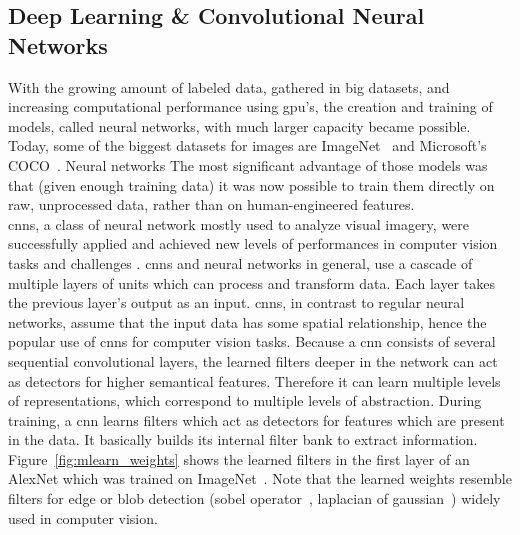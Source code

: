 \subsection{Deep Learning \& Convolutional Neural Networks}
With the growing amount of labeled data, gathered in big datasets, and increasing computational performance using \gls{gpu}'s, the creation and training of models, called neural networks, with much larger capacity became possible. Today, some of the biggest datasets for images are ImageNet~\cite{Russakovsky2015ImageNetChallenge} and Microsoft's COCO~\cite{Lin2014MicrosoftContext}.
Neural networks
The most significant advantage of those models was that (given enough training data) it was now possible to train them directly on raw, unprocessed data, rather than on human-engineered features.\\
\gls{cnn}s, a class of neural network mostly used to analyze visual imagery, were successfully applied \cite{Lecun2015DeepLearning} and achieved new levels of performances in computer vision tasks and challenges \cite{Krizhevsky2012ImageNetNetworks,Simonyan2014VeryRecognition,Szegedy2014GoingConvolutions,He2015DeepRecognition,Zeiler2014VisualizingNetworks}. 
\gls{cnn}s and neural networks in general, use a cascade of multiple layers of units which can process
and transform data. Each layer takes the previous layer's output as an input. \gls{cnn}s, in contrast to regular neural networks, assume that the input data has some spatial relationship, hence the popular use of \gls{cnn}s for computer vision tasks. Because a \gls{cnn} consists of several sequential convolutional layers, the learned filters deeper in the network can act as detectors for higher semantical features. Therefore it can learn multiple levels of representations, which correspond to multiple levels of abstraction. During training, a \gls{cnn} learns filters which act as detectors for features which are present in the data. It basically builds its internal filter bank to extract information. Figure~\ref{fig:mlearn_weights} shows the learned filters in the first layer of an AlexNet which was trained on ImageNet~\cite{Russakovsky2015ImageNetChallenge}. Note that the learned weights resemble filters for edge or blob detection (sobel operator~\cite{Sobel1990AnOperator}, laplacian of gaussian~\cite{Marr187}) widely used in computer vision.\\

